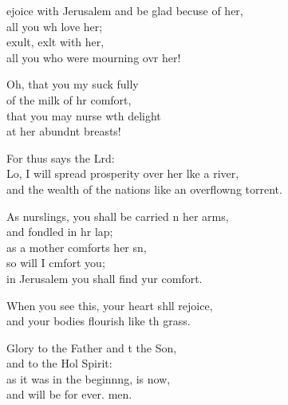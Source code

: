 \settowidth{\versewidth}{and the wealth of the nations like an overflowing torrent.}
\begin{psalmverse}%
  \begin{patverse}
ejoice with Jerusalem and be glad becuse of her,\Med\\
all you wh love her;\\
exult, exlt with her,\Med\\
all you who were mourning ovr her!

Oh, that you my suck fully\Med\\
of the milk of hr comfort,\\
that you may nurse wth delight\Med\\
at her abundnt breasts!

For thus says the Lrd:\Flex\\
Lo, I will spread prosperity over her lke a river,\Med\\
and the wealth of the nations like an overflow\pointup{\i}ng torrent.

As nurslings, you shall be carried n her arms,\Med\\
and fondled in hr lap;\\
as a mother comforts her sn,\Flex\\
so will I cmfort you;\Med\\
in Jerusalem you shall find yur comfort.

When you see this, your heart shll rejoice,\Med\\
and your bodies flourish like th grass.

Glory to the Father and t the Son,\Med\\
and to the Hol Spirit:\\
as it was in the beginnng, is now,\Med\\
and will be for ever. men.
  \end{patverse}
\end{psalmverse}
